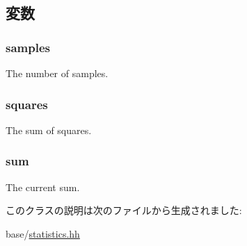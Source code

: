 \subsection{変数}
\hypertarget{classStats_1_1SampleStor_ab4db99aba3dd28686061dd3d5475b3bd}{
\subsubsection[{samples}]{ {\bf samples}}}
\label{classStats_1_1SampleStor_ab4db99aba3dd28686061dd3d5475b3bd}
The number of samples. \hypertarget{classStats_1_1SampleStor_a0c02ec1e072d692448ce4429a78e3675}{
\subsubsection[{squares}]{ {\bf squares}}}
\label{classStats_1_1SampleStor_a0c02ec1e072d692448ce4429a78e3675}
The sum of squares. \hypertarget{classStats_1_1SampleStor_ab5b201cce7e10c48f62b71605e75707e}{
\subsubsection[{sum}]{ {\bf sum}}}
\label{classStats_1_1SampleStor_ab5b201cce7e10c48f62b71605e75707e}
The current sum. 

このクラスの説明は次のファイルから生成されました:\begin{DoxyCompactItemize}
\item 
base/\hyperlink{statistics_8hh}{statistics.hh}\end{DoxyCompactItemize}
